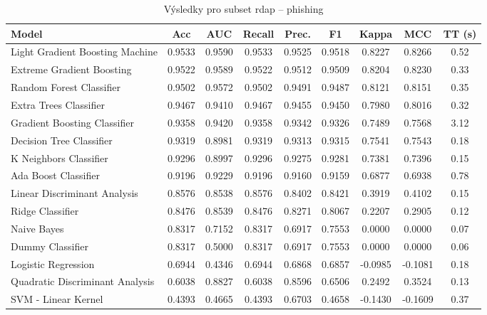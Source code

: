 \begin{table}[H]
  \centering
  \small
  \caption{Výsledky pro subset rdap – phishing}
  \begin{tabular}{|l|c|c|c|c|c|c|c|c|}
    \hline
    \textbf{Model} & \textbf{Acc} & \textbf{AUC} & \textbf{Recall} & \textbf{Prec.} & \textbf{F1} & \textbf{Kappa} & \textbf{MCC} & \textbf{TT (s)} \\
    \hline
    Light Gradient Boosting Machine & 0.9533 & 0.9590 & 0.9533 & 0.9525 & 0.9518 & 0.8227 & 0.8266 & 0.52 \\
    Extreme Gradient Boosting & 0.9522 & 0.9589 & 0.9522 & 0.9512 & 0.9509 & 0.8204 & 0.8230 & 0.33 \\
    Random Forest Classifier & 0.9502 & 0.9572 & 0.9502 & 0.9491 & 0.9487 & 0.8121 & 0.8151 & 0.35 \\
    Extra Trees Classifier & 0.9467 & 0.9410 & 0.9467 & 0.9455 & 0.9450 & 0.7980 & 0.8016 & 0.32 \\
    Gradient Boosting Classifier & 0.9358 & 0.9420 & 0.9358 & 0.9342 & 0.9326 & 0.7489 & 0.7568 & 3.12 \\
    Decision Tree Classifier & 0.9319 & 0.8981 & 0.9319 & 0.9313 & 0.9315 & 0.7541 & 0.7543 & 0.18 \\
    K Neighbors Classifier & 0.9296 & 0.8997 & 0.9296 & 0.9275 & 0.9281 & 0.7381 & 0.7396 & 0.15 \\
    Ada Boost Classifier & 0.9196 & 0.9229 & 0.9196 & 0.9160 & 0.9159 & 0.6877 & 0.6938 & 0.78 \\
    Linear Discriminant Analysis & 0.8576 & 0.8538 & 0.8576 & 0.8402 & 0.8421 & 0.3919 & 0.4102 & 0.15 \\
    Ridge Classifier & 0.8476 & 0.8539 & 0.8476 & 0.8271 & 0.8067 & 0.2207 & 0.2905 & 0.12 \\
    Naive Bayes & 0.8317 & 0.7152 & 0.8317 & 0.6917 & 0.7553 & 0.0000 & 0.0000 & 0.07 \\
    Dummy Classifier & 0.8317 & 0.5000 & 0.8317 & 0.6917 & 0.7553 & 0.0000 & 0.0000 & 0.06 \\
    Logistic Regression & 0.6944 & 0.4346 & 0.6944 & 0.6868 & 0.6857 & -0.0985 & -0.1081 & 0.18 \\
    Quadratic Discriminant Analysis & 0.6038 & 0.8827 & 0.6038 & 0.8596 & 0.6506 & 0.2492 & 0.3524 & 0.13 \\
    SVM - Linear Kernel & 0.4393 & 0.4665 & 0.4393 & 0.6703 & 0.4658 & -0.1430 & -0.1609 & 0.37 \\
    \hline
  \end{tabular}
\end{table}
\vspace{0.5cm}

